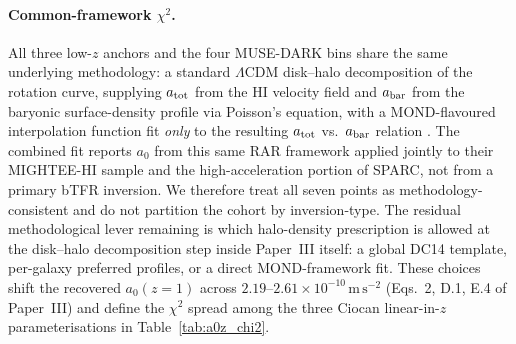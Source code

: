 \documentclass[twocolumn,letterpaper]{aastex631}
\newcommand{\azero}{a_0}
\begin{document}
\paragraph{Common-framework $\chi^{2}$.}  All three low-$z$
anchors and the four MUSE-DARK bins share the same underlying
methodology: a standard $\Lambda$CDM disk--halo decomposition of
the rotation curve, supplying $a_{\rm tot}$ from the HI velocity
field and $a_{\rm bar}$ from the baryonic surface-density
profile via Poisson's equation, with a MOND-flavoured
interpolation function fit \emph{only} to the resulting
$a_{\rm tot}$ vs.\ $a_{\rm bar}$ relation
\citep[as explicitly stated for SPARC by][and adopted
identically in Paper~III]{McGaugh2016}.  The
\citet{Varasteanu2025} combined fit reports $\azero$ from this
same RAR framework applied jointly to their MIGHTEE-HI sample
and the high-acceleration portion of SPARC, not from a primary
bTFR inversion.  We therefore treat all seven points as
methodology-consistent and do not partition the cohort by
inversion-type.  The residual methodological lever remaining is
which halo-density prescription is allowed at the disk--halo
decomposition step inside Paper~III itself: a global DC14
template, per-galaxy preferred profiles, or a direct
MOND-framework fit.  These choices shift the recovered
$\azero(z\!=\!1)$ across $2.19$--$2.61\!\times\!10^{-10}\,
\mathrm{m\,s^{-2}}$ (Eqs.~2, D.1, E.4 of Paper~III) and define
the $\chi^{2}$ spread among the three Ciocan linear-in-$z$
parameterisations in Table~\ref{tab:a0z_chi2}.
\end{document}
